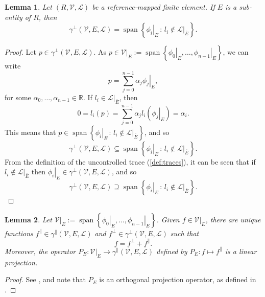\documentclass[sn-mathphys-num]{sn-jnl}%
\theoremstyle{thmstyleone}%
\newtheorem{lemma}{Lemma}%
\newcommand{\closure}[1]{\overline{#1}}
\newcommand{\subentity}{E}
\newcommand{\refel}{R}
\newcommand{\polyspace}{\mathcal{V}}
\newcommand{\dualbasis}{\mathcal{L}}
\newcommand{\unctrace}[3]{\gamma^\perp(#1,#2,#3)}
\newcommand{\ctrace}[3]{\gamma^\parallel(#1,#2,#3)}
\theoremstyle{thmstyletwo}%
\theoremstyle{thmstylethree}%
\begin{document}
\begin{lemma}\label{lemma:first-unc}
Let $(\refel,\polyspace,\dualbasis)$ be a reference-mapped finite element.
If $\subentity$ is a sub-entity of $\refel$, then
\[
\unctrace{\polyspace}{\subentity}{\dualbasis} =
\operatorname{span}\left\{\left.\phi_i\right|_{\subentity}\,:\,l_i\not\in\left.\dualbasis\right|_{\closure{\subentity}}\right\}.
\]
\end{lemma}
\begin{proof}
Let $p\in\unctrace{\polyspace}{\subentity}{\dualbasis}$. As $p\in\left.\polyspace\right|_{\subentity}:=\operatorname{span}\left\{\left.\phi_0\right|_{\subentity},\dots,\left.\phi_{n-1}\right|_{\subentity}\right\}$, we can write
\[p=\sum_{j=0}^{n-1}\alpha_j\left.\phi_j\right|_{\subentity},\]
for some $\alpha_0,\dots,\alpha_{n-1}\in\mathbb{R}$.
If $l_i\in\dualbasis|_{\closure{\subentity}}$, then
\[
0 = l_i(p)
=\sum_{j=0}^{n-1}\alpha_jl_i\left(\left.\phi_j\right|_{\subentity}\right)
=\alpha_i.
\]
This means that $p\in\operatorname{span}\left\{\left.\phi_i\right|_{\subentity}\,:\,l_i\not\in\left.\dualbasis\right|_{\closure{\subentity}}\right\}$,
and so
\[\unctrace{\polyspace}{\subentity}{\dualbasis} \subseteq
\operatorname{span}\left\{\left.\phi_i\right|_{\subentity}\,:\,l_i\not\in\left.\dualbasis\right|_{\closure{\subentity}}\right\}.
\]
From the definition of the uncontrolled trace (\cref{def:traces}), it can be seen that if
$l_i\not\in\left.\dualbasis\right|_{\closure{\subentity}}$ then $\left.\phi_i\right|_{\subentity}\in\unctrace{\polyspace}{\subentity}{\dualbasis}$, and so 
\[\unctrace{\polyspace}{\subentity}{\dualbasis} \supseteq
\operatorname{span}\left\{\left.\phi_i\right|_{\subentity}\,:\,l_i\not\in\left.\dualbasis\right|_{\closure{\subentity}}\right\}.
\]
\end{proof}

\begin{lemma}\label{lemma:zeroth}
Let \(\left.\polyspace\right|_{\subentity}:=\operatorname{span}\left\{\left.\phi_0\right|_{\subentity},\dots,\left.\phi_{n-1}\right|_{\subentity}\right\}\).
Given $f\in\left.\polyspace\right|_{\subentity}$, there are unique functions
$f^\parallel\in\ctrace{\polyspace}{\subentity}{\dualbasis}$
and
$f^\perp\in\unctrace{\polyspace}{\subentity}{\dualbasis}$
such that
\[f=f^\perp+f^\parallel.\]
Moreover, the operator $P_{\subentity}:\left.\polyspace\right|_{\subentity}\to\ctrace{\polyspace}{\subentity}{\dualbasis}$
defined by $P_{\subentity}:f\mapsto f^\parallel$ is a linear projection.
\end{lemma}
\begin{proof}
See \cite[theorem 3.3-4]{kreyszig}, and note that $P_{\subentity}$ is an orthogonal projection
operator, as defined in \cite[section 3.3]{kreyszig}.
\end{proof}
\end{document}
